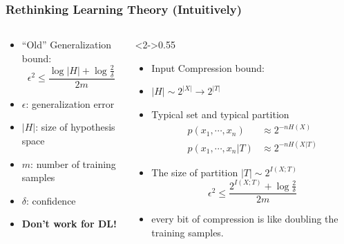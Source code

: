 \documentclass[notes]{beamer}
\begin{document}
\begin{frame}
    \frametitle{Rethinking Learning Theory (Intuitively)}
    \begin{columns}[T]
        \begin{column}{0.45\textwidth}
            \begin{itemize}
                \item ``Old'' Generalization bound:
                \begin{equation*}
                    \epsilon^2 \leq \frac{\log|H|+\log\frac{2}{\delta}}{2m}
                \end{equation*}
                \item $\epsilon$: generalization error
                \item $|H|$: size of hypothesis space
                \item $m$: number of training samples
                \item $\delta$: confidence
                \item \textbf{Don't work for DL!} 
            \end{itemize}
        \end{column}
        \begin{column}<2->{0.55\textwidth}
            \begin{itemize}
                \item Input Compression bound:
                \item $|H|\sim 2^{|X|}\to 2^{|T|}$
                \item Typical set and typical partition
                \begin{align*}
                    p(x_1,\cdots,x_n) & \approx 2^{-nH(X)}\\
                    p(x_1,\cdots,x_n|T)& \approx 2^{-nH(X|T)}
                \end{align*}
                \item The size of partition $|T|\sim 2^{I(X;T)}$
                \begin{equation*}
                    \epsilon^2\leq \frac{2^{I(X;T)}+\log\frac{2}{\delta}}{2m}
                \end{equation*}
                \item every bit of compression is like doubling the training samples.
            \end{itemize}
        \end{column}
    \end{columns}
\end{frame}
\end{document}
